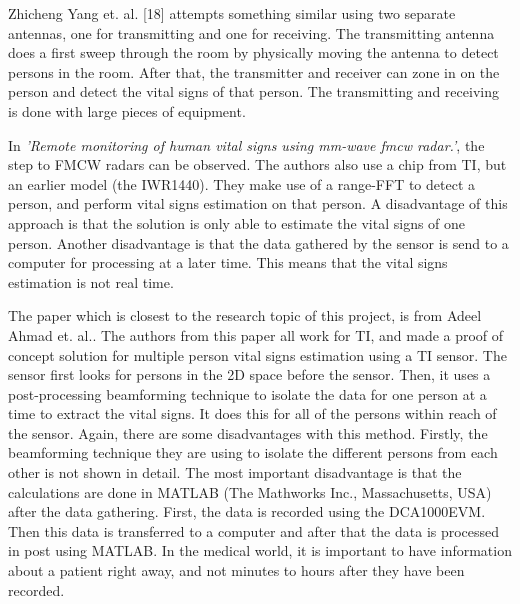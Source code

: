 Zhicheng Yang et. al. [18] attempts something similar using two separate antennas, one for transmitting and one for receiving. The transmitting antenna does a first sweep through the room by physically moving the antenna to detect persons in the room. After that, the transmitter and receiver can zone in on the person and detect the vital signs of that person. The transmitting and receiving is done with large pieces of equipment. 

In \emph{'Remote monitoring of human vital signs using mm-wave fmcw radar.'}\cite{alizadeh2019remote}, the step to FMCW radars can be observed. The authors also use a chip from TI, but an earlier model (the IWR1440). They make use of a range-FFT to detect a person, and perform vital signs estimation on that person. A disadvantage of this approach is that the solution is only able to estimate the vital signs of one person. Another disadvantage is that the data gathered by the sensor is send to a computer for processing at a later time. This means that the vital signs estimation is not real time. 

The paper which is closest to the research topic of this project, is from Adeel Ahmad et. al.\cite{ahmad2018vital}. The authors from this paper all work for TI, and made a proof of concept solution for multiple person vital signs estimation using a TI sensor. The sensor first looks for persons in the 2D space before the sensor. Then, it uses a post-processing beamforming technique to isolate the data for one person at a time to extract the vital signs. It does this for all of the persons within reach of the sensor. Again, there are some disadvantages with this method. Firstly, the beamforming technique they are using to isolate the different persons from each other is not shown in detail. The most important disadvantage is that the calculations are done in MATLAB (The Mathworks Inc., Massachusetts, USA) after the data gathering. First, the data is recorded using the DCA1000EVM. Then this data is transferred to a computer and after that the data is processed in post using MATLAB. In the medical world, it is important to have information about a patient right away, and not minutes to hours after they have been recorded. 
